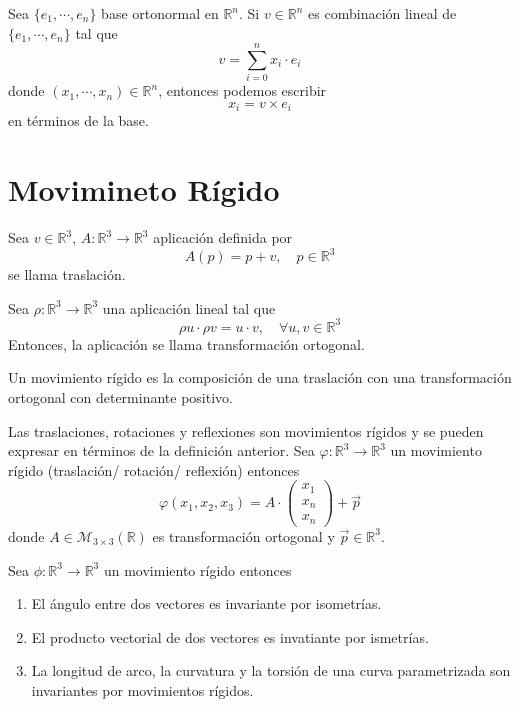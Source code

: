 \begin{prop}
  Sea $\{ e_{1}, \cdots, e_{n} \}$ base ortonormal en $\mathbb{R}^{n}$. Si $v \in \mathbb{R}^{n}$ es combinación lineal de $\{ e_{1}, \cdots, e_{n} \}$ tal que \[ 
    v = \sum_{i = 0}^{n} x_{i} \cdot e_{i}
  \]  
  donde $( x_{1}, \cdots, x_{n} ) \in \mathbb{R}^{n}$, entonces podemos escribir
  \[ 
    x_{i} = v \times e_{i}
  \] 
  en términos de la base.
\end{prop}

\section{Movimineto Rígido}

\begin{defn}[Traslación]
  Sea $v \in \mathbb{R}^{3}$, $A : \mathbb{R}^{3} \to \mathbb{R}^{3}$ aplicación definida por
  \[ 
    A(p) = p + v, \quad p \in \mathbb{R}^{3} 
  \] 
  se llama traslación.
\end{defn}

\begin{defn}
  Sea $\rho : \mathbb{R}^{3} \to \mathbb{R}^{3}$ una aplicación lineal tal que
  \[ 
    \rho u \cdot \rho v = u \cdot v, \quad \forall u, v \in \mathbb{R}^{3}
  \] 
  Entonces, la aplicación se llama transformación ortogonal.
\end{defn}

\begin{defn}
  Un movimiento rígido es la composición de una traslación con una transformación ortogonal con determinante positivo.
\end{defn}

\begin{obs}
  Las traslaciones, rotaciones y reflexiones son movimientos rígidos y se pueden expresar en términos de la definición anterior. Sea $\varphi: \mathbb{R}^{3} \to \mathbb{R}^{3}$ un movimiento rígido (traslación/ rotación/ reflexión) entonces
  \[ 
    \varphi(x_{1},x_{2},x_{3}) = A \cdot 
    \begin{pmatrix}
      x_1 \\ x_{n} \\ x_n
    \end{pmatrix} 
    + \vec{p}
  \] 
  donde $A \in \mathcal{M}_{3 \times 3}(\mathbb{R})$ es transformación ortogonal y $\vec{p} \in \mathbb{R}^{3}$.
\end{obs}


\begin{prop}
  Sea $\phi : \mathbb{R}^{3} \to \mathbb{R}^{3}$ un movimiento rígido entonces
  \begin{enumerate}[label=(\roman*)]
    \item El ángulo entre dos vectores es invariante por isometrías.
    \item El producto vectorial de dos vectores es invatiante por ismetrías.
    \item La longitud de arco, la curvatura y la torsión de una curva parametrizada son invariantes por movimientos rígidos.
  \end{enumerate}
\end{prop}

